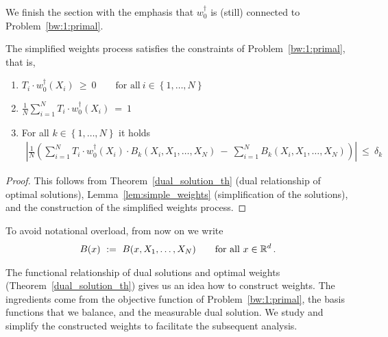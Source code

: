 We finish the section with the emphasis that $w^\dagger_0$ is (still) connected to Problem~\ref{bw:1:primal}.
\begin{theorem}
  \label{th:weights_constr}
  The simplified weights process satisfies the constraints
  of Problem~\ref{bw:1:primal}, that is,
  \begin{enumerate}[label=(\roman*)]
    \item
      $
      T_i\cdot w_0^\dagger(X_i)
      \ 
      \ge
      \ 
      0
      \qquad
      \text{for all}\ 
      i\in  \left\{ 1,\ldots,N \right\}
      $
    \item
      $
      \frac{1}{N}
      \sum_{i=1}^{N} 
      T_i\cdot w_0^\dagger(X_i)
      \ 
      =
      \ 
      1
      $
    \item
      For all $k\in \left\{ 1,\ldots,N \right\}$
      it holds
      \begin{align*}
      \left| 
      \frac{1}{N}
      \left( 
        \sum_{i=1}^{N} 
      T_i\cdot w_0^\dagger(X_i)
      \cdot
        B_k(X_i,X_1,\ldots,X_N)
        \
        -
        \
        \sum_{i=1}^{N} 
        B_k(X_i,X_1,\ldots,X_N)
      \right)
      \right|
      \ 
      \le
      \ 
      \delta_k
      \end{align*}
  \end{enumerate}
\end{theorem}
\begin{proof}
  This follows from Theorem~\ref{dual_solution_th}
  (dual relationship of optimal solutions),
  Lemma~\ref{lem:simple_weights} (simplification of the solutions),
  and the construction of the simplified weights process.
\end{proof}
To avoid notational overload, from now on we write
\begin{align*}
  B(x)
  \ 
  :=
  \ 
  B(x,X_1,\ldots,X_N)
  \qquad
  \text{for all}\ 
  x\in\R^d
  \,.
\end{align*}
\begin{takeaways}
  The functional relationship of dual solutions and optimal weights (Theorem~\ref{dual_solution_th}) gives us an idea how to construct weights.
  The ingredients come from the objective function of Problem~\ref{bw:1:primal},
  the basis functions that we balance, and the measurable dual solution.
  We study and simplify the constructed weights to facilitate the subsequent analysis.
\end{takeaways}
